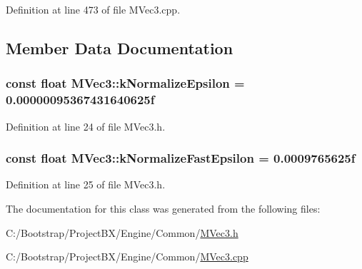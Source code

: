 Definition at line 473 of file MVec3.cpp.

\subsection{Member Data Documentation}
\hypertarget{class_m_vec3_fe4df239e5cc14ba66ccdc907bff32c6}{
\subsubsection[{kNormalizeEpsilon}]{\setlength{\rightskip}{0pt plus 5cm}const float {\bf MVec3::kNormalizeEpsilon} = 0.00000095367431640625f}}
\label{class_m_vec3_fe4df239e5cc14ba66ccdc907bff32c6}




Definition at line 24 of file MVec3.h.\hypertarget{class_m_vec3_1d3f4b88e43530acdf3733e50b858d41}{
\subsubsection[{kNormalizeFastEpsilon}]{\setlength{\rightskip}{0pt plus 5cm}const float {\bf MVec3::kNormalizeFastEpsilon} = 0.0009765625f}}
\label{class_m_vec3_1d3f4b88e43530acdf3733e50b858d41}




Definition at line 25 of file MVec3.h.

The documentation for this class was generated from the following files:\begin{CompactItemize}
\item 
C:/Bootstrap/ProjectBX/Engine/Common/\hyperlink{_m_vec3_8h}{MVec3.h}\item 
C:/Bootstrap/ProjectBX/Engine/Common/\hyperlink{_m_vec3_8cpp}{MVec3.cpp}\end{CompactItemize}
